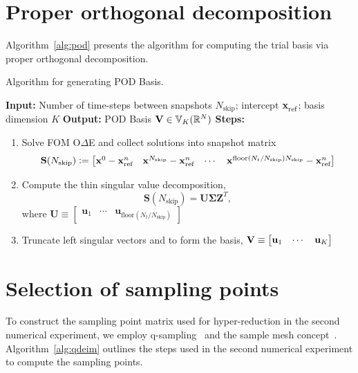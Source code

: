 \documentclass[3p,computermodern,10pt]{elsarticle}
\begin{document}
\begin{appendices}
\section{Proper orthogonal decomposition}
Algorithm~\ref{alg:pod} presents the algorithm for computing the trial basis via proper orthogonal decomposition.
\begin{algorithm}
\caption{Algorithm for generating POD Basis.}
\label{alg:pod}
\textbf{Input:} Number of time-steps between snapshots $N_{\text{skip}}$; intercept $\mathbf{x}_\text{ref}^{}$; basis dimension $K$ \; 
\textbf{Output:} POD Basis $\mathbf {V} \in \mathbb{V}_{K}(\mathbb{R}^{N})$ \;
\textbf{Steps:}
\begin{enumerate}
    \item Solve FOM O$\Delta$E and collect solutions into snapshot matrix
$$\mathbf{S}(N_{\text{skip}}) \vcentcolon= \begin{bmatrix} {\mathbf{x}}^{0} - \mathbf{x}_\text{ref}^{n} & {\mathbf{x}}^{N_{\text{skip}}} - \mathbf{x}_\text{ref}^{n} & \cdots & {\mathbf{x}}^{\text{floor}(N_t/N_{\text{skip}})N_{\text{skip}}} - \mathbf{x}_\text{ref}^{n} \end{bmatrix}$$
    \item Compute the thin singular value decomposition, $$\mathbf{S} (N_{\text{skip}}) = \mathbf{U \Sigma Z}^T,$$
    where $\mathbf{U} \equiv \begin{bmatrix} \mathbf{u}_1 & \cdots & \mathbf{u}_{\text{floor}(N_t/N_{\text{skip}})}\end{bmatrix}$
    \item Truncate left singular vectors and to form the basis, $\mathbf {V} \equiv \begin{bmatrix} \mathbf{u}_1 & \cdots & \mathbf{u}_K \end{bmatrix}$
\end{enumerate}


\end{algorithm}


\section{Selection of sampling points}
To construct the sampling point matrix used for hyper-reduction in the second numerical experiment, we employ q-sampling~\cite{qdeim_drmac} and the sample 
mesh concept~\cite{carlberg_gnat}. Algorithm~\ref{alg:qdeim} outlines the steps used in the second numerical experiment to compute the sampling points.


\end{appendices}
\end{document}
